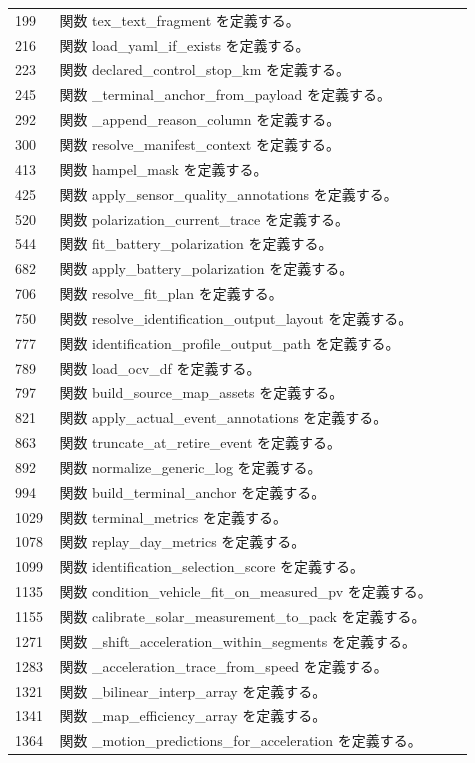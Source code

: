 \documentclass[a4paper,11pt]{article}
\begin{document}
\begin{longtable}{p{0.07\linewidth} p{0.84\linewidth}}
199 & 関数 tex\_text\_fragment を定義する。 \\
216 & 関数 load\_yaml\_if\_exists を定義する。 \\
223 & 関数 declared\_control\_stop\_km を定義する。 \\
245 & 関数 \_terminal\_anchor\_from\_payload を定義する。 \\
292 & 関数 \_append\_reason\_column を定義する。 \\
300 & 関数 resolve\_manifest\_context を定義する。 \\
413 & 関数 hampel\_mask を定義する。 \\
425 & 関数 apply\_sensor\_quality\_annotations を定義する。 \\
520 & 関数 polarization\_current\_trace を定義する。 \\
544 & 関数 fit\_battery\_polarization を定義する。 \\
682 & 関数 apply\_battery\_polarization を定義する。 \\
706 & 関数 resolve\_fit\_plan を定義する。 \\
750 & 関数 resolve\_identification\_output\_layout を定義する。 \\
777 & 関数 identification\_profile\_output\_path を定義する。 \\
789 & 関数 load\_ocv\_df を定義する。 \\
797 & 関数 build\_source\_map\_assets を定義する。 \\
821 & 関数 apply\_actual\_event\_annotations を定義する。 \\
863 & 関数 truncate\_at\_retire\_event を定義する。 \\
892 & 関数 normalize\_generic\_log を定義する。 \\
994 & 関数 build\_terminal\_anchor を定義する。 \\
1029 & 関数 terminal\_metrics を定義する。 \\
1078 & 関数 replay\_day\_metrics を定義する。 \\
1099 & 関数 identification\_selection\_score を定義する。 \\
1135 & 関数 condition\_vehicle\_fit\_on\_measured\_pv を定義する。 \\
1155 & 関数 calibrate\_solar\_measurement\_to\_pack を定義する。 \\
1271 & 関数 \_shift\_acceleration\_within\_segments を定義する。 \\
1283 & 関数 \_acceleration\_trace\_from\_speed を定義する。 \\
1321 & 関数 \_bilinear\_interp\_array を定義する。 \\
1341 & 関数 \_map\_efficiency\_array を定義する。 \\
1364 & 関数 \_motion\_predictions\_for\_acceleration を定義する。 \\
            \bottomrule
            \end{longtable}
\end{document}
